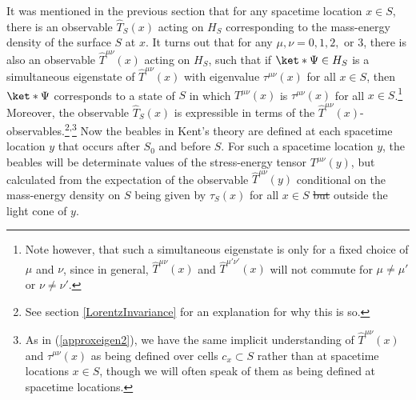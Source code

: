 \documentclass[12pt]{report}
\providecommand{\DIFadd}[1]{{\protect\color{blue}\uwave{#1}}} %
\providecommand{\DIFdel}[1]{{\protect\color{red}\sout{#1}}}                      %
\providecommand{\DIFaddbegin}{} %
\providecommand{\DIFaddend}{} %
\providecommand{\DIFdelbegin}{} %
\providecommand{\DIFdelend}{} %
\begin{document}
It was mentioned in the previous section that for any spacetime location $x\in S$,  there is an observable $\hat{T}_S(x)$ acting on $H_S$ corresponding to the mass-energy density \DIFaddbegin \DIFadd{$T_S(x)$ }\DIFaddend of the surface $S$ at $x$. It turns out that for any $\mu, \nu=0,1,2,$ or $3$, there is also an observable  $\hat{T}^{\mu\nu}(x)$ acting  %
%
 on $H_S$, such that if \DIFdelbegin \DIFdel{$\ket*{\Psi}\in H_S$ }\DIFdelend \DIFaddbegin \DIFadd{$\ket*{\Gamma}\in H_S$ }\DIFaddend is a simultaneous eigenstate of $\hat{T}^{\mu\nu}(x)$ with eigenvalue $\tau^{\mu\nu}(x)$ for  %
%
 all $x\in S$, then \DIFdelbegin \DIFdel{$\ket*{\Psi}$ }\DIFdelend \DIFaddbegin \DIFadd{$\ket*{\Gamma}$ }\DIFaddend corresponds to a state of $S$ in which $T^{\mu\nu}(x)$ is  $\tau^{\mu\nu}(x)$ for all $x\in S$.\footnote{Note however, that such a simultaneous eigenstate is only for a fixed choice of $\mu$ and $\nu$, since in general, $\hat{T}^{\mu\nu}(x)$ and $\hat{T}^{\mu'\nu'}(x)$ will not commute for $\mu\neq\mu'$ or $\nu\neq\nu'$. } Moreover, the observable $\hat{T}_S(x)$ is expressible in terms of the  $\hat{T}^{\mu\nu}(x)$-observables.\footnote{See section  \ref{LorentzInvariance} for an explanation for why this is so.}\textsuperscript{,}\footnote{As in (\ref{approxeigen2}), we have the same implicit understanding of $\hat{T}^{\mu\nu}(x)$ and $\tau^{\mu\nu}(x)$ as being defined over cells $c_x\subset S$ rather than at spacetime locations $x\in S$, though we will often speak of them as being defined at spacetime locations. }
Now the  beables in Kent's theory are defined at each spacetime location $y$ that occurs after $S_0$ and before $S$. For such a spacetime location $y$, the beables will be determinate values of the stress-energy tensor $T^{\mu\nu}(y)$, but calculated from the expectation of the observable $\hat{T}^{\mu\nu}(y)$ conditional on the mass-energy density \DIFaddbegin \DIFadd{$T_S(x)$ }\DIFaddend on $S$ being given by $\tau_S(x)$ for all \DIFaddbegin \DIFadd{the }\DIFaddend $x\in S$ \DIFdelbegin \DIFdel{but }\DIFdelend \DIFaddbegin \DIFadd{that are }\DIFaddend outside the light cone of $y$. 
\DIFaddbegin 
\end{document}
